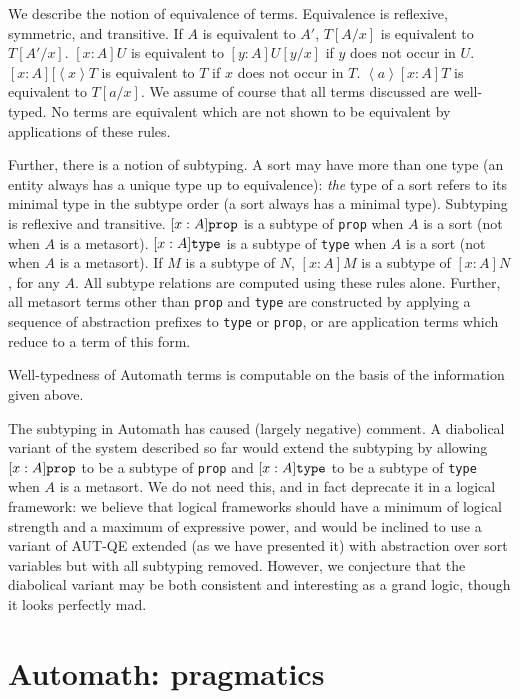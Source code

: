 \documentclass{article}
\begin{document}
We describe the notion of equivalence of terms.  Equivalence is reflexive, symmetric, and transitive.  If $A$ is equivalent to $A'$, $T[A/x]$ is equivalent to $T[A'/x]$.  $[x:A]U$ is equivalent to $[y:A]U[y/x]$ if $y$ does not occur in $U$.  $[x:A][\left<x\right>T$ is equivalent to $T$ if $x$ does not occur in $T$.
$\left<a\right>[x:A]T$ is equivalent to $T[a/x]$.  We assume of course that all terms discussed are well-typed.  No terms are equivalent which are not shown to be equivalent by applications of these rules.

Further, there is a notion of subtyping.  A sort may have more than one type (an entity always has a unique type up to equivalence):  {\em the\/} type of a sort refers to its minimal type in the subtype order (a sort always has a minimal type).  Subtyping is reflexive and transitive.  $[x:A]{\tt prop}$ is a subtype of {\tt prop} when $A$ is a sort (not when $A$ is a metasort).  $[x:A]{\tt type}$ is a subtype of {\tt type} when $A$ is a sort (not when $A$ is a metasort).  If $M$ is a subtype of $N$, $[x:A]M$ is a subtype of $[x:A]N$, for any $A$.  All subtype relations are computed using these rules alone.  Further, all metasort terms other than {\tt prop} and {\tt type} are constructed by applying a sequence of abstraction prefixes to
{\tt type} or {\tt prop}, or are application terms which reduce to a term of this form.

Well-typedness of Automath terms is computable on the basis of the information given above.

The subtyping in Automath has caused (largely negative) comment.  A diabolical variant of the system described so far would extend the subtyping by
allowing $[x:A]{\tt prop}$ to be a subtype of {\tt prop} and $[x:A]{\tt type}$ to be a subtype of {\tt type} when $A$ is a metasort.  We do not need this, and in fact deprecate it in a logical framework:  we believe that logical frameworks should have a minimum of logical strength and a maximum of expressive power, and would be inclined to use a variant of AUT-QE extended (as we have presented it) with abstraction over sort variables but with all subtyping removed.  However, we conjecture that the diabolical variant may be both consistent and interesting as a grand logic, though it looks perfectly mad.


\section{Automath:  pragmatics}
\end{document}
